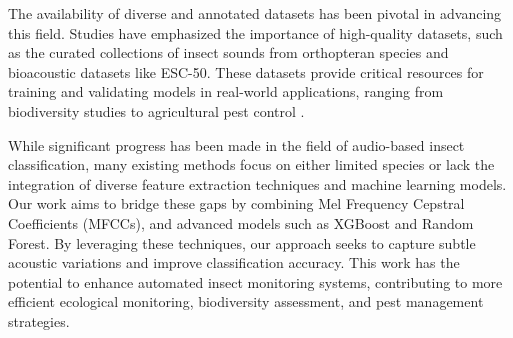 The availability of diverse and annotated datasets has been pivotal in advancing this field. Studies have emphasized the importance of high-quality datasets, such as the curated collections of insect sounds from orthopteran species and bioacoustic datasets like ESC-50. These datasets provide critical resources for training and validating models in real-world applications, ranging from biodiversity studies to agricultural pest control \cite{acoustic_insect_mfcc_lfcc,ml_insect_bioacoustics,framework_insect_sound_analysis}.

While significant progress has been made in the field of audio-based insect classification, many existing methods focus on either limited species or lack the integration of diverse feature extraction techniques and machine learning models. Our work aims to bridge these gaps by combining Mel Frequency Cepstral Coefficients (MFCCs), and advanced models such as XGBoost and Random Forest. By leveraging these techniques, our approach seeks to capture subtle acoustic variations and improve classification accuracy. This work has the potential to enhance automated insect monitoring systems, contributing to more efficient ecological monitoring, biodiversity assessment, and pest management strategies.